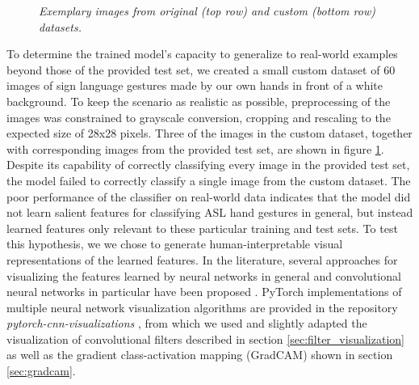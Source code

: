 \documentclass[a4paper]{article}
\begin{document}
\begin{figure}[t]
\begin{tabular}{ccc}
     \end{tabular}
     \caption{\textit{Exemplary images from original (top row) and custom (bottom row) datasets.}}
     \label{fig:custom_dataset} 
\end{figure}
To determine the trained model's capacity to generalize to real-world examples beyond those of the provided test set, we created a small custom dataset of 60 images of sign language gestures made by our own hands in front of a white background. To keep the scenario as realistic as possible, preprocessing of the images was constrained to grayscale conversion, cropping and rescaling to the expected size of 28x28 pixels. Three of the images in the custom dataset, together with corresponding images from the provided test set, are shown in figure \ref{fig:custom_dataset}. Despite its capability of correctly classifying every image in the provided test set, the model failed to correctly classify a single image from the custom dataset. The poor performance of the classifier on real-world data indicates that the model did not learn salient features for classifying ASL hand gestures in general, but instead learned features only relevant to these particular training and test sets. To test this hypothesis, we we chose to generate human-interpretable visual representations of the learned features. In the literature, several approaches for visualizing the features learned by neural networks in general and convolutional neural networks in particular have been proposed \cite{Qin2018}. PyTorch implementations of multiple neural network visualization algorithms are provided in the repository \textit{pytorch-cnn-visualizations} \cite{Ozbulak2018}, from which we used and slightly adapted the visualization of convolutional filters described in section \ref{sec:filter_visualization} as well as the gradient class-activation mapping (GradCAM) shown in section \ref{sec:gradcam}.
\end{document}

